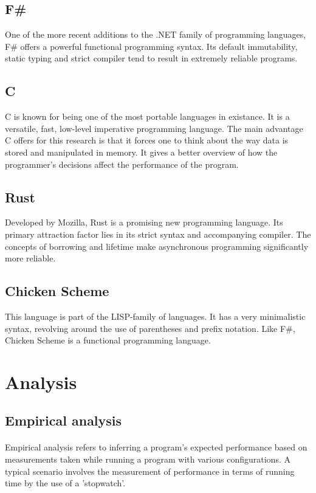\documentclass{article}
\begin{document}
\subsection{F\#}
One of the more recent additions to the .NET family of programming languages,
F\# offers a powerful functional programming syntax.
Its default immutability, static typing and strict compiler tend to result in extremely reliable programs.

\subsection{C}
C is known for being one of the most portable languages in existance.
It is a versatile, fast, low-level imperative programming language.
The main advantage C offers for this research is that it forces one to think about the way data is stored and manipulated in memory.
It gives a better overview of how the programmer's decisions affect the performance of the program.

\subsection{Rust}
Developed by Mozilla, Rust is a promising new programming language.
Its primary attraction factor lies in its strict syntax and accompanying compiler.
The concepts of borrowing and lifetime make asynchronous programming significantly more reliable.

\subsection{Chicken Scheme}
This language is part of the LISP-family of languages.
It has a very minimalistic syntax, revolving around the use of parentheses and prefix notation.
Like F\#, Chicken Scheme is a functional programming language.

\section{Analysis}

\subsection{Empirical analysis}
\paragraph{}
Empirical analysis refers to inferring a program's expected performance based on measurements taken while running a program with various configurations.
A typical scenario involves the measurement of performance in terms of running time by the use of a 'stopwatch'.
\end{document}
